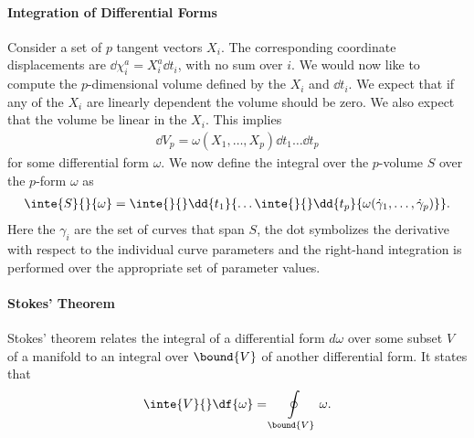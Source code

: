 \paragraph{Integration of Differential Forms}
Consider a set of $p$ tangent vectors $X_{i}$. The corresponding coordinate displacements are $\dd{\chi_{i}^{a}} = X_{i}^{a}\dd{t_{i}}$, with no sum over $i$. We would now like to compute the $p$-dimensional volume defined by the $X_{i}$ and $\dd{t_{i}}$. We expect that if any of the $X_{i}$ are linearly dependent the volume should be zero. We also expect that the volume be linear in the $X_{i}$. This implies
\begin{align*}
	\dd{V_{p}} = \omega(X_{1}, \dots, X_{p})\dd{t_{1}}\dots\dd{t_{p}}
\end{align*}
for some differential form $\omega$. We now define the integral over the $p$-volume $S$ over the $p$-form $\omega$ as
\begin{align*}
	\inte{S}{}{\omega} = \inte{}{}\dd{t_{1}}{\dots \inte{}{}\dd{t_{p}}{\omega(\dot{\gamma}_{1},\dots, \dot{\gamma}_{p})}}.
\end{align*}
Here the $\gamma_{i}$ are the set of curves that span $S$, the dot symbolizes the derivative with respect to the individual curve parameters and the right-hand integration is performed over the appropriate set of parameter values.

\paragraph{Stokes' Theorem}
Stokes' theorem relates the integral of a differential form $d\omega$ over some subset $V$ of a manifold to an integral over $\bound{V}$ of another differential form. It states that
\begin{align*}
	\inte{V}{}\df{\omega} = \oint\limits_{\bound{V}}\omega.
\end{align*}